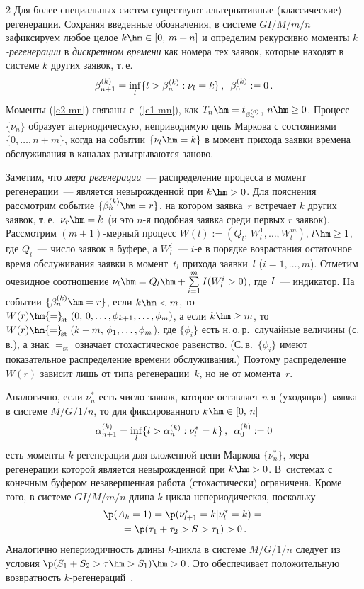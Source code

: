 \begin{multicols}{2}
Для  более специальных систем существуют альтернативные (классические)
регенерации. Со\-хра\-няя введенные обозначения, в сис\-те\-ме $GI/M/m/n$ зафиксируем
любое целое $k\hm\in [0,\, m+n]$ и определим рекурсивно моменты  {\it $k$-ре\-ге\-не\-ра\-ции} 
в {\it дискретном времени}  как номера тех заявок, которые
находят  в системе $k$ других заявок, т.\,е.\ 
 \begin{equation}
\beta^{(k)}_{n+1}=\inf_l\{l>\beta^{(k)}_{n}: \nu_l=k\}\,, \enskip
\beta^{(k)}_0:=0\,.
\label{e2-mn}
\end{equation}
Моменты  (\ref{e2-mn}) связаны с~(\ref{e1-mn}), как
$T_n\hm=t_{\beta^{(0)}_n}$, $n\hm\ge0$. Процесс $\{\nu_n\}$ образует апериодическую,
неприводимую цепь Маркова с  состояниями $\{0,\ldots,n+m\}$, когда на 
событии $\{\nu_l\hm=k \}$ в момент прихода   заявки
времена обслуживания  в каналах  разыгрываются заново. 

Заметим, что
{\it мера регенерации}~--- распределение процесса в момент
регенерации~--- является невырожденной при  $k\hm>0$. Для пояснения
рассмотрим событие $\{\beta^{(k)}_{n}\hm=r\}$, на котором заявка~$r$
встречает $k$ других заявок, т.\,е.\ $\nu_r\hm=k$ (и это $n$-я подобная
заявка среди первых $r$ заявок). Рассмотрим $(m+1)$-мер\-ный процесс
$W(l):=(Q_l,\, W_l^1, \ldots, W_l^m)$, $l\hm\ge1$, где $Q_l$~--- число
заявок  в буфере, а $W_l^i$~--- $i$-е в порядке возрастания
остаточное время обслуживания заявки  в момент~$t_l$ прихода заявки~$l$
($i=1,\dots,m$). Отметим очевидное соотношение
$\nu_l\hm=Q_l\hm+\sum\limits_{i=1}^mI(W_l^i>0)$, где $I$~--- индикатор. На событии
$\{\beta^{(k)}_{n}\hm=r\}$, если $k\hm< m$, то
$W(r)\hm{=}_{\!\mathrm{st}}\;(0,\,0,\ldots,\phi_{k+1}, \ldots, \phi_m)$, а если $k\hm\ge m$, 
то $W(r)\hm{=}_{\!\mathrm{st}}\;(k-m,\,\phi_1, \ldots, \phi_m$), где $\{\phi_i\}$
есть н.\,о.\,р.\   случайные величины (с.\,в.), а знак ${=}_{\mathrm{st}}$ означает 
стохастическое равенство. (С.\,в.~$\{\phi_i\}$  имеют показательное распределение    времени
обслуживания.) Поэтому распределение $W(r)$ зависит лишь от типа регенерации~$k$, но не от момента~$r$.

Аналогично, если $\nu_n^*$ есть число заявок, которое оставляет $n$-я
(уходящая)  заявка в системе  $M/G/1/n$,  то для фиксированного $k\hm\in[0,\,n]$
 \begin{equation*}
\alpha^{(k)}_{n+1}=\inf\limits_l\{l>\alpha^{(k)}_{n}: \nu_l^*=k\}\,,
\enskip\alpha^{(k)}_{0}:=0
 \end{equation*}
 есть  моменты $k$-регенерации для вложенной  цепи Маркова $\{\nu_n^*\}$, 
 мера регенерации которой   является невырожденной при $k\hm>0$.
 В~сис\-те\-мах с конечным буфером   незавершенная работа  (стохастически) ограничена.
Кроме того, в системе $GI/M/m/n$  длина $k$-цик\-ла непериодическая, поскольку
\begin{multline*}
\p(A_k=1)=\p(\nu^*_{l+1}=k|\nu^*_l=k)={}\\
{}=\p(\tau_1+\tau_2>S>\tau_1)>0\,.
\end{multline*}
Аналогично непериодичность длины $k$-цик\-ла в сис\-те\-ме $M/G/1/n$
следует из условия $\p(S_1+S_2>\tau\hm>S_1)\hm>0$.  Это обеспечивает положительную
 возвратность  $k$-ре\-ге\-не\-ра\-ций~\cite{MorozovDelgado}.
 

\end{multicols}
